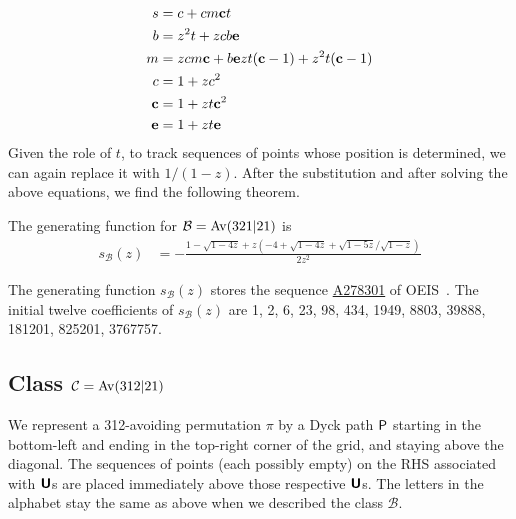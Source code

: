 \documentclass[12pt, a4paper, twoside]{report}
\begin{document}
\begin{align*}
s &= c + cm\mathbf{c} t\\
b &= z^2t + zcb\mathbf{e}\\
m &= zcm\mathbf{c} + b\mathbf{e} zt(\mathbf{c} -1) + z^2t(\mathbf{c} -1)\\
c &= 1+zc^2\\
\mathbf{c} &= 1+ zt\mathbf{c}^2\\
\mathbf{e} &= 1+zt\mathbf{e}
\end{align*}
Given the role of $t$, to track sequences of points whose position is determined, we can again replace it with $1/(1-z)$. After the substitution and after solving the above equations, we find the following theorem.
\begin{theorem}
The generating function for $\mathcal{B} = \mathrm{Av}(321|21)$ is 
\begin{align*}
  s_{\mathcal{B}}(z) &= -\frac{1-\sqrt{1-4z} + z(-4+\sqrt{1-4z} + \sqrt{1-5z}/\sqrt{1-z})}{2z^2}
\end{align*}
\end{theorem}

The generating function $s_{\mathcal{B}}(z)$ stores the sequence \href{http://oeis.org/A278301}{A278301} of OEIS~\cite{oeis}. The initial twelve coefficients of $s_{\mathcal{B}}(z)$ are 1, 2, 6, 23, 98, 434, 1949, 8803, 39888, 181201, 825201, 3767757.

\subsection{Class $\mathcal{C} = \mathrm{Av}(312|21)$}
\label{sec:classC}
We represent a 312-avoiding permutation $\pi$ by a Dyck path $\textsf{P}$ starting in the bottom-left and ending in the top-right corner of the grid, and staying above the diagonal. The sequences of points (each possibly empty) on the RHS associated with $\textbf{\textsf{U}}$s are placed immediately above those respective $\textbf{\textsf{U}}$s. The letters in the alphabet stay the same as above when we described the class $\mathcal{B}$.
\end{document}
